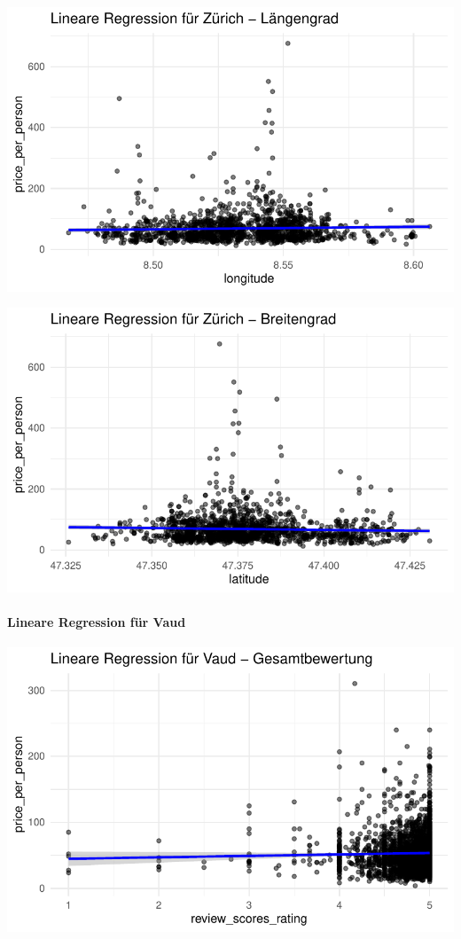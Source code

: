 \documentclass[
  journal,
]{IEEEtran}%
\let\oldparagraph\paragraph
\renewcommand{\paragraph}[1]{\oldparagraph{#1}\mbox{}}
\begin{document}
\includegraphics{main_files/figure-pdf/unnamed-chunk-14-7.pdf}

\includegraphics{main_files/figure-pdf/unnamed-chunk-14-8.pdf}

\hypertarget{lineare-regression-fuxfcr-vaud}{%
\paragraph{Lineare Regression für
Vaud}\label{lineare-regression-fuxfcr-vaud}}

\includegraphics{main_files/figure-pdf/unnamed-chunk-15-1.pdf}
\end{document}
